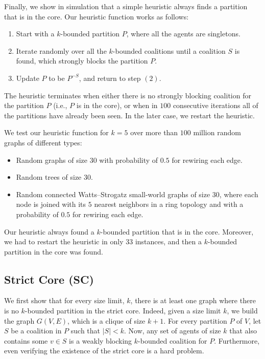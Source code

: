 \documentclass[sigconf,anonymous]{aamas}
\begin{document}
Finally, we show in simulation that a simple heuristic always finds a partition that is in the core.
Our heuristic function works as follows:
\begin{enumerate}
    \item Start with a $k$-bounded partition $P$, where all the agents are singletons.
    \item Iterate randomly over all the $k$-bounded coalitions until a coalition $S$ is found, which strongly blocks the partition $P$.
    \item Update $P$ to be $P^{-S}$, and return to step $(2)$.
\end{enumerate}
The heuristic terminates when either there is no strongly blocking coalition for the partition $P$ (i.e., $P$ is in the core), or when in $100$ consecutive iterations all of the partitions have already been seen. In the later case, we restart the heuristic.

We test our heuristic function for $k=5$ over more than $100$ million random graphs of different types: 
\begin{itemize}
\item Random graphs of size $30$ with probability of $0.5$ for rewiring each edge.
\item Random trees of size $30$.
\item Random connected Watts–Strogatz small-world graphs of size $30$, where each node is joined with its $5$ nearest neighbors in a ring topology and with a probability of $0.5$ for rewiring each edge.
\end{itemize}
Our heuristic always found a $k$-bounded partition that is in the core. Moreover, we had to restart the heuristic in only $33$ instances, and then a $k$-bounded partition in the core was found.

\subsection{Strict Core (SC)}
We first show that for every size limit, $k$, there is at least one graph where there is no $k$-bounded partition in the strict core.
Indeed, given a size limit $k$, we build the graph $G(V,E)$, which is a clique of size $k+1$. For every partition $P$ of $V$, let $S$ be a coalition in $P$ such that $|S| < k$. Now, any set of agents of size $k$ that also contains some $v \in S$ is a weakly blocking $k$-bounded coalition for $P$. 
%
Furthermore, even verifying the existence of the strict core is a hard problem.
\end{document}

